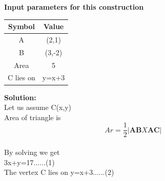 \documentclass[10pt,a4paper]{report}
\let\vec\mathbf
\begin{document}
\begin{multicols}{2}
\textbf{Input parameters for this construction}
\begin{center}
\begin{tabular}{|c|c|}
\hline
\textbf{Symbol}&{Value}\\
\hline
A&(2,1)\\
\hline
B&(3,-2)\\
\hline
Area&5\\
\hline
C lies on&y=x+3\\
\hline
\end{tabular}
\end{center}
\textbf{  Solution:}\\
Let us assume C(x,y)\\
Area of triangle is \\
 \textbf
{ $$ Ar=\frac{1}{2}\left| \vec{AB}X\vec{AC} \right| $$}
\\   %
By solving we get\\
  3x+y=17......(1)\\
  The vertex C lies on y=x+3......(2)  \\	 
		  

\end{multicols}
\end{document}
